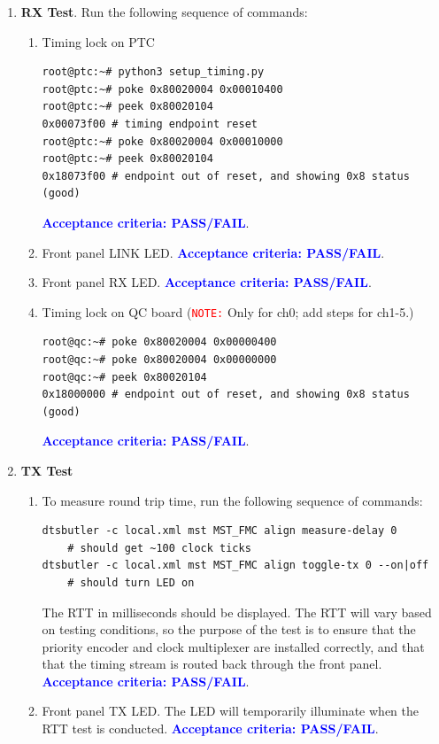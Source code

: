 \documentclass[a4paper,12pt]{article}
\begin{document}
    \begin{enumerate}
        \item \textbf{RX Test}. Run the following sequence of commands:
        \begin{enumerate}
            \item Timing lock on PTC
\begin{verbatim}
root@ptc:~# python3 setup_timing.py
root@ptc:~# poke 0x80020004 0x00010400
root@ptc:~# peek 0x80020104
0x00073f00 # timing endpoint reset
root@ptc:~# poke 0x80020004 0x00010000
root@ptc:~# peek 0x80020104
0x18073f00 # endpoint out of reset, and showing 0x8 status (good)
\end{verbatim}
        \textcolor{blue}{\textbf{Acceptance criteria: PASS/FAIL}}.
            \item Front panel LINK LED. \textcolor{blue}{\textbf{Acceptance criteria: PASS/FAIL}}.
            \item Front panel RX LED. \textcolor{blue}{\textbf{Acceptance criteria: PASS/FAIL}}.
            \item Timing lock on QC board (\texttt{\textcolor{red}{NOTE:}} Only for ch0; add steps for ch1-5.)
\begin{verbatim}
root@qc:~# poke 0x80020004 0x00000400
root@qc:~# poke 0x80020004 0x00000000
root@qc:~# peek 0x80020104
0x18000000 # endpoint out of reset, and showing 0x8 status (good)
\end{verbatim}
        \textcolor{blue}{\textbf{Acceptance criteria: PASS/FAIL}}.
        \end{enumerate}
        \item \textbf{TX Test}
            \begin{enumerate}
                \item To measure round trip time, run the following sequence of commands:
\begin{verbatim}
dtsbutler -c local.xml mst MST_FMC align measure-delay 0 
    # should get ~100 clock ticks
dtsbutler -c local.xml mst MST_FMC align toggle-tx 0 --on|off 
    # should turn LED on
\end{verbatim}
                The RTT in milliseconds should be displayed. The RTT will vary based on testing conditions, so the purpose of the test is to ensure that the priority encoder and clock multiplexer are installed correctly, and that that the timing stream is routed back through the front panel. \textcolor{blue}{\textbf{Acceptance criteria: PASS/FAIL}}.
                \item Front panel TX LED. The LED will temporarily illuminate when the RTT test is conducted. \textcolor{blue}{\textbf{Acceptance criteria: PASS/FAIL}}.
            \end{enumerate}
    \end{enumerate}    
\end{document}
